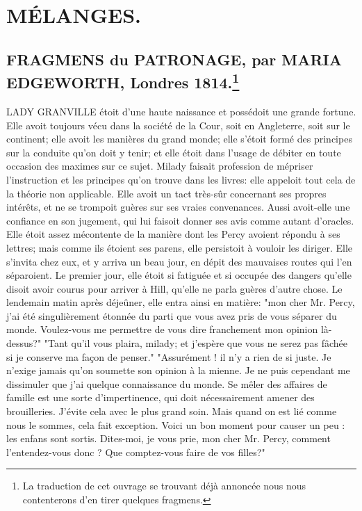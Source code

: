 \setcounter{page}{383}
\chapter{MÉLANGES.}
\section{FRAGMENS du PATRONAGE, par MARIA EDGEWORTH, Londres 1814.\footnote{La traduction de cet ouvrage se trouvant déjà annoncée nous nous contenterons d'en tirer quelques fragmens.}}
LADY GRANVILLE étoit d'une haute naissance et possédoit une grande fortune. Elle avoit toujours vécu dans la société de la Cour, soit en Angleterre, soit sur le continent; elle avoit les manières du grand monde; elle s'étoit formé des principes sur la conduite qu'on doit y tenir; et elle étoit dans l'usage de débiter\setcounter{page}{384} en toute occasion des maximes sur ce sujet.
Milady faisait profession de mépriser l'instruction et les principes qu'on trouve dans les livres: elle appeloit tout cela de la théorie non applicable. Elle avoit un tact très-sûr concernant ses propres intérêts, et ne se trompoit guères sur ses vraies convenances. Aussi avoit-elle une confiance en son jugement, qui lui faisoit donner ses avis comme autant d'oracles.
Elle étoit assez mécontente de la manière dont les Percy avoient répondu à ses lettres; mais comme ils étoient ses parens, elle persistoit à vouloir les diriger. Elle s'invita chez eux, et y arriva un beau jour, en dépit des mauvaises routes qui l'en séparoient. Le premier jour, elle étoit si fatiguée et si occupée des dangers qu'elle disoit avoir courus pour arriver à Hill, qu'elle ne parla guères d'autre chose. Le lendemain matin après déjeûner, elle entra ainsi en matière: "mon cher Mr. Percy, j'ai été singulièrement étonnée du parti que vous avez pris de vous séparer du monde. Voulez-vous me permettre de vous dire franchement mon opinion là-dessus?"
"Tant qu'il vous plaira, milady; et j'espère que vous ne serez pas fâchée si je conserve ma façon de penser."\setcounter{page}{385} "Assurément ! il n'y a rien de si juste. Je n'exige jamais qu'on soumette son opinion à la mienne. Je ne puis cependant me dissimuler que j'ai quelque connaissance du monde. Se mêler des affaires de famille est une sorte d'impertinence, qui doit nécessairement amener des brouilleries. J'évite cela avec le plus grand soin. Mais quand on est lié comme nous le sommes, cela fait exception. Voici un bon moment pour causer un peu : les enfans sont sortis. Dites-moi, je vous prie, mon cher Mr. Percy, comment l'entendez-vous donc ? Que comptez-vous faire de vos filles?"

